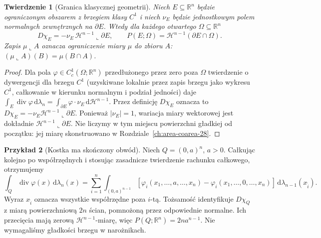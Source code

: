 \documentclass[11pt,a4paper,oneside]{book}
\numberwithin{equation}{chapter}
\theoremstyle{plain}
\newtheorem{twierdzenie}{Twierdzenie}[chapter]
\theoremstyle{definition}
\newtheorem{przyklad}[twierdzenie]{Przykład}
\theoremstyle{remark}
\begin{document}
\begin{twierdzenie}[Granica klasycznej geometrii]
\label{thm:smooth-perimeter-29}
Niech $E\subseteq\mathbb R^n$ będzie ograniczonym
obszarem z brzegiem klasy $C^1$ i niech
$\nu_E$ będzie jednostkowym polem normalnych
zewnętrznych na $\partial E$. Wtedy dla każdego
otwartego $\Omega\subseteq\mathbb R^n$
\[
 D\chi_E=-\nu_E\,\mathcal H^{n-1}\llcorner\partial E,
 \qquad P(E;\Omega)=\mathcal H^{n-1}(\partial E\cap\Omega).
\]
Zapis $\mu\llcorner A$ oznacza ograniczenie miary
$\mu$ do zbioru $A$: $(\mu\llcorner A)(B)=\mu(B\cap A)$.
\end{twierdzenie}
\begin{proof}
Dla pola $\varphi\in C_c^1(\Omega;\mathbb R^n)$
przedłużonego przez zero poza $\Omega$ twierdzenie
o dywergencji dla brzegu $C^1$ (uzyskiwane lokalnie
przez zapis brzegu jako wykresu $C^1$, całkowanie
w kierunku normalnym i podział jedności) daje
$\int_E\operatorname{div}\varphi
\,\mathrm d\lambda_n
=\int_{\partial E}\varphi\cdot\nu_E
\,\mathrm d\mathcal H^{n-1}$.
Przez definicję $D\chi_E$ oznacza to
$D\chi_E=-\nu_E\mathcal H^{n-1}\llcorner\partial E$.
Ponieważ $|\nu_E|=1$, wariacja miary wektorowej
jest dokładnie $\mathcal H^{n-1}\llcorner\partial E$.
Nie liczymy w tym miejscu powierzchni gładkiej
od początku: jej miarę skonstruowano w
Rozdziale~\ref{ch:area-coarea-28}.
\end{proof}

\begin{przyklad}[Kostka ma skończony obwód]
\label{ex:cube-perimeter-29}
Niech $Q=(0,a)^n$, $a>0$. Całkując kolejno po
współrzędnych i stosując zasadnicze twierdzenie
rachunku całkowego, otrzymujemy
\[
 \int_Q\operatorname{div}\varphi(x)\,\mathrm d\lambda_n(x)
 =\sum_{i=1}^n\int_{(0,a)^{n-1}}
 [\varphi_i(x_1,\ldots,a,\ldots,x_n)-
  \varphi_i(x_1,\ldots,0,\ldots,x_n)]
 \,\mathrm d\lambda_{n-1}(x_{\widehat i}).
\]
Wyraz $x_{\widehat i}$ oznacza wszystkie współrzędne
poza $i$-tą. Tożsamość identyfikuje
$D\chi_Q$ z miarą powierzchniową $2n$ ścian,
pomnożoną przez odpowiednie normalne. Ich
przecięcia mają zerową $\mathcal H^{n-1}$-miarę,
więc $P(Q;\mathbb R^n)=2na^{n-1}$.
Nie wymagaliśmy gładkości brzegu w narożnikach.
\end{przyklad}
\end{document}
